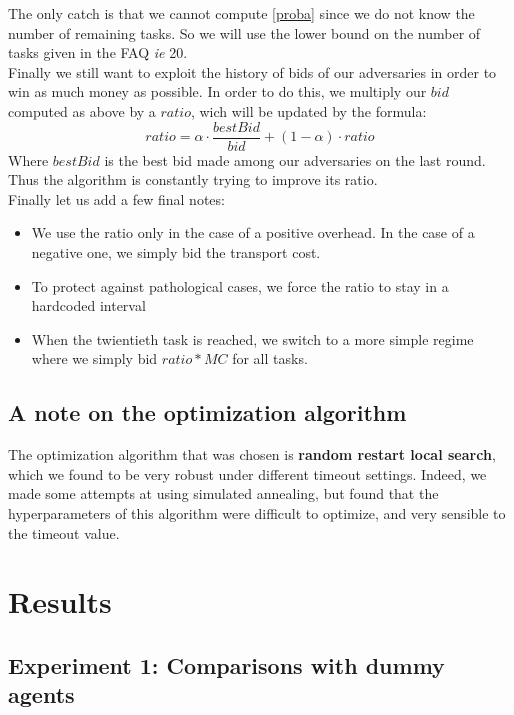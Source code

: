 \documentclass[11pt]{article}
\begin{document}
The only catch is that we cannot compute \eqref{proba} since we do not know the number of remaining tasks. So we will use the lower bound on the number of tasks given in the FAQ \textit{ie} 20.
\\

Finally we still want to exploit the history of bids of our adversaries in order to win as much money as possible. In order to do this, we multiply our $bid$ computed as above by a $ratio$, wich will be updated by the formula:
$$ ratio = \alpha \cdot \frac{bestBid}{bid} + (1-\alpha)\cdot ratio $$
Where $bestBid$ is the best bid made among our adversaries on the last round. Thus the algorithm is constantly trying to improve its ratio. 
\\

Finally let us add a few final notes:
\begin{itemize}
\item We use the ratio only in the case of a positive overhead. In the case of a negative one, we simply bid the transport cost. 
\item To protect against pathological cases, we force the ratio to stay in a hardcoded interval
\item When the twientieth task is reached, we switch to a more simple regime where we simply bid $ratio*MC$ for all tasks.
\end{itemize}

\subsection{A note on the optimization algorithm}
The optimization algorithm that was chosen is \textbf{random restart local search}, which we found to be very robust under different timeout settings. Indeed, we made some attempts at using simulated annealing, but found that the hyperparameters of this algorithm were difficult to optimize, and very sensible to the timeout value.

\section{Results}

\subsection{Experiment 1: Comparisons with dummy agents}
\end{document}
